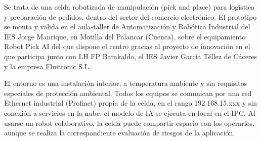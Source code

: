 Se trata de una celda robotizada de manipulación (pick and place) para logística y preparación de pedidos,
dentro del sector del comercio electrónico. El prototipo se monta y valida en el aula-taller de Automatización y
Robótica Industrial del IES Jorge Manrique, en Motilla del Palancar (Cuenca), sobre el equipamiento Robot Pick
AI del que dispone el centro gracias al proyecto de innovación en el que participa junto con LH FP Barakaldo,
el IES Javier García Téllez de Cáceres y la empresa Fluitronic S.L.

El entorno es una instalación interior, a temperatura ambiente y sin requisitos especiales de protección
ambiental. Todos los equipos se comunican por una red Ethernet industrial (Profinet) propia de la celda, en el
rango 192.168.15.xxx y sin conexión a servicios en la nube: el modelo de IA se ejecuta en local en el IPC. Al
usarse un robot colaborativo, la celda puede compartir espacio con los operarios, aunque se realiza la
correspondiente evaluación de riesgos de la aplicación.
